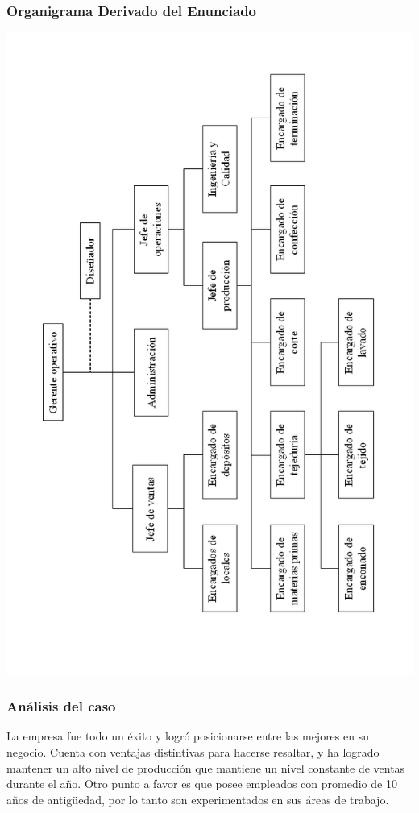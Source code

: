 \documentclass[a4paper,10pt,titlepage]{article}
\begin{document}
\subsubsection{Organigrama Derivado del Enunciado}
	\begin{center}
	\includegraphics[width=450pt]{./DollyOrnigrama.png}
	\end{center}

\subsubsection{An\'{a}lisis del caso}

	La empresa fue todo un \'exito y logr\'o posicionarse entre las mejores en su negocio. Cuenta con ventajas distintivas para hacerse resaltar, y ha logrado mantener un alto nivel de producci\'on que mantiene un nivel constante de ventas durante el a\~no. Otro punto a favor es que posee empleados con promedio de 10 a\~nos de antig\"uedad, por lo tanto son experimentados en sus \'areas de trabajo.\\
		
\end{document}

